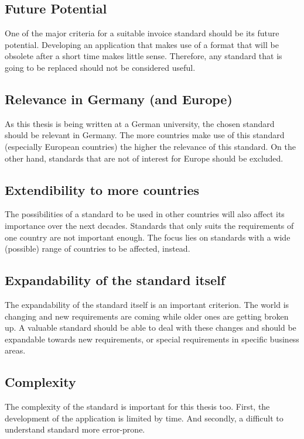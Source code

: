 \subsection{Future Potential}
\label{sec2.2.1}
One of the major criteria for a suitable invoice standard should be its future potential. Developing an application that makes use of a format that will be obsolete after a short time makes little sense. Therefore, any standard that is going to be replaced should not be considered useful.

\subsection{Relevance in Germany (and Europe)}
\label{sec2.2.2}
As this thesis is being written at a German university, the chosen standard should be relevant in Germany. The more countries make use of this standard (especially European countries) the higher the relevance of this standard. On the other hand, standards that are not of interest for Europe should be excluded.

\subsection{Extendibility to more countries}
\label{sec2.2.3}
The possibilities of a standard to be used in other countries will also affect its importance over the next decades. Standards that only suits the requirements of one country are not important enough. The focus lies on standards with a wide (possible) range of countries to be affected, instead.

\subsection{Expandability of the standard itself}
\label{sec2.2.4}
The expandability of the standard itself is an important criterion. The world is changing and new requirements are coming while older ones are getting broken up. A valuable standard should be able to deal with these changes and should be expandable towards new requirements, or special requirements in specific business areas.

\subsection{Complexity}
\label{sec2.2.5}
The complexity of the standard is important for this thesis too. First, the development of the application is limited by time. And secondly, a difficult to understand standard more error-prone.


